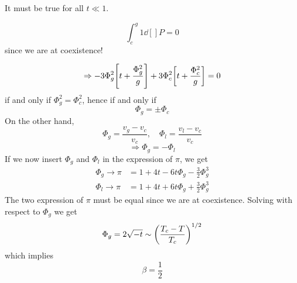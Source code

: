 \documentclass[../main/main.tex]{subfiles}
\begin{document}
It must be true for all \( t \ll 1 \).
\begin{remark}
\begin{equation}
  \int_{c}^{g} 1  \dd[]{P} = 0
\end{equation}
since we are at coexistence!
\end{remark}
\begin{equation}
  \Rightarrow - 3 \Phi _g^2 \qty[t + \frac{\Phi_g ^2}{g}] + 3 \Phi _c^2 \qty[t + \frac{\Phi _c^2}{g}] = 0
\end{equation}
if and only if \( \Phi _g^2 = \Phi _c^2 \), hence if and only if
\begin{equation}
  \Phi _g = \pm \Phi _c
\end{equation}
On the other hand,
\begin{equation}
  \Phi _g = \frac{v_g - v_c}{v_c}, \quad \Phi _l = \frac{v_l - v_c}{v_c}
\end{equation}
\begin{equation}
\Rightarrow   \Phi _g = - \Phi _l
\end{equation}
If we now insert \( \Phi _g \) and \( \Phi _l \) in the expression of \( \pi  \), we get
\begin{subequations}
\begin{align}
  \Phi _g \rightarrow \pi  &= 1 + 4 t - 6 t \Phi _g - \frac{3}{2} \Phi _g^3  \\
    \Phi _l \rightarrow \pi  &= 1 + 4 t + 6 t \Phi _g + \frac{3}{2} \Phi _g^3
\end{align}
\end{subequations}
The two expression of \( \pi  \)  must be equal since we are at coexistence. Solving with respect to \( \Phi _g \) we get
\begin{equation}
  \Phi _g = 2 \sqrt{-t} \sim \qty(\frac{T_c-T}{T_c})^{1/2}
\end{equation}
which implies
\begin{equation}
  \beta = \frac{1}{2}
\end{equation}
\end{document}
